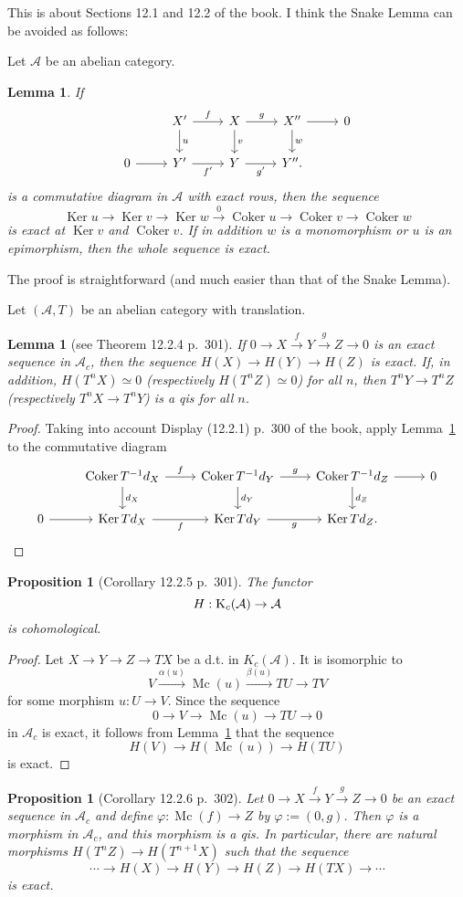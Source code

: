 \documentclass[12pt]{article}
\newtheorem{lem}[thm]{Lemma}
\newtheorem{prop}[thm]{Proposition}
\theoremstyle{remark}
\theoremstyle{definition}
\newcommand{\A}{\mathcal A}
\newcommand{\pp}{\varphi}
\newcommand{\xr}{\xrightarrow}
\DeclareMathOperator{\Coker}{Coker}
\DeclareMathOperator{\Ker}{Ker}
\DeclareMathOperator{\Mc}{Mc}
\begin{document}
This is about Sections 12.1 and 12.2 of the book. I think the Snake Lemma can be avoided as follows: 

Let $\A$ be an abelian category. 

\begin{lem}\label{sl1}
If 
$$
\begin{tikzcd}
{}&X'\ar{d}{u}\ar{r}{f}&X\ar{d}{v}\ar{r}{g}&X''\ar{d}{w}\ar{r}&0\\ 
0\ar{r}&Y'\ar{r}[swap]{f'}&Y\ar{r}[swap]{g'}&Y''.
\end{tikzcd}
$$ 
is a commutative diagram in $\A$ with exact rows, then the sequence 
$$
\Ker u\to\Ker v\to\Ker w\xr0\Coker u\to\Coker v\to\Coker w
$$
is exact at $\Ker v$ and $\Coker v$. If in addition $w$ is a monomorphism or $u$ is an epimorphism, then the whole sequence is exact.
\end{lem}
%
The proof is straightforward (and much easier than that of the Snake Lemma). 

Let $(\A,T)$ be an abelian category with translation. 

\begin{lem}[see Theorem 12.2.4 p.~301]\label{sl2}
If $0\to X\xr fY\xr g Z\to0$ is an exact sequence in $\A_c$, then the sequence $H(X)\to H(Y)\to H(Z)$ is exact. If, in addition, $H(T^nX)\simeq0$ (respectively $H(T^nZ)\simeq0$) for all $n$, then $T^nY\to T^nZ$ (respectively $T^nX\to T^nY$) is a qis for all $n$. 
\end{lem}

\begin{proof}
Taking into account Display (12.2.1) p.~300 of the book, apply Lemma~\ref{sl1} to the commutative diagram 
$$
\begin{tikzcd}
{}&\Coker T^{-1}d_X\ar{d}{d_X}\ar{r}{f}&\Coker T^{-1}d_Y\ar{d}{d_Y}\ar{r}{g}&\Coker T^{-1}d_Z\ar{d}{d_Z}\ar{r}&0\\ 
0\ar{r}&\Ker Td_X\ar{r}[swap]{f}&\Ker Td_Y\ar{r}[swap]{g}&\Ker Td_Z.
\end{tikzcd}
$$ 
\end{proof}

\begin{prop}[Corollary 12.2.5 p.~301]\label{sl3}
The functor 
$$
H:\text K_c(\A)\to\A
$$ 
is cohomological.  
\end{prop}

\begin{proof}
Let $X\to Y\to Z\to TX$ be a d.t. in $K_c(\A)$. It is isomorphic to 
$$
V\xr{\alpha(u)}\Mc(u)\xr{\beta(u)}TU\to TV
$$ 
for some morphism $u:U\to V$. Since the sequence 
$$
0\to V\to\Mc(u)\to TU\to0
$$ 
in $\A_c$ is exact, it follows from Lemma~\ref{sl2} that the sequence 
$$ 
H(V)\to H(\Mc(u))\to H(TU)
$$ 
is exact.
\end{proof}
%
\begin{prop}[Corollary 12.2.6 p.~302]\label{sl4}
Let $0\to X\xr f Y\xr g Z\to0$ be an exact sequence in $\A_c$ and define $\pp:\Mc(f)\to Z$ by $\pp:=(0,g)$. Then $\pp$ is a morphism in $\A_c$, and this morphism is a qis. In particular, there are natural morphisms $H(T^nZ)\to H(T^{n+1}X)$ such that the sequence 
$$
\cdots\to H(X)\to H(Y)\to H(Z)\to H(TX)\to\cdots
$$
is exact. 
\end{prop}
\end{document}
